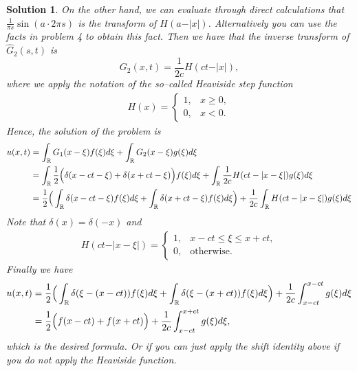 \documentclass[6pt]{article}
\newtheorem{solution}{Solution}
\numberwithin{equation}{section}
\def\mathbb{\Bbb}
\begin{document}
\begin{enumerate}
\begin{solution}
On the other hand, we can evaluate through direct calculations that $\frac{1}{\pi s}\sin{(a\cdot 2\pi s)}$ is the transform of $H(a-\vert x\vert)$.  Alternatively you can use the facts in problem 4 to obtain this fact.  Then we have that the inverse transform of $\hat{G}_2 (s,t)$ is
\[G_2(x,t)=\frac{1}{2c}H(ct-\vert x\vert),\]
where we apply the notation of the so--called Heaviside step function
\begin{align*}
H(x)=
\begin{cases}
1, &x\geq 0, \\
0, &x<0.
\end{cases}
\end{align*}
Hence, the solution of the problem is
\begin{align*}
u(x,t)&=\int_{\mathbb{R}}G_1(x-\xi)f(\xi)d\xi+\int_{\mathbb{R}}G_2(x-\xi)g(\xi)d\xi \\
& = \int_{\mathbb{R}}\frac{1}{2}\Big(\delta(x-ct-\xi)+\delta(x+ct-\xi)\Big)f(\xi)d\xi+\int_{\mathbb{R}}\frac{1}{2c}H(ct-\vert x-\xi\vert)g(\xi)d\xi\\
&=\frac{1}{2}\Big(\int_{\mathbb{R}}\delta(x-ct-\xi)f(\xi)d\xi+\int_{\mathbb{R}}\delta(x+ct-\xi)f(\xi)d\xi\Big)+\frac{1}{2c}\int_{\mathbb{R}}H(ct-\vert x-\xi\vert)g(\xi)d\xi
\end{align*}
Note that $\delta(x)=\delta(-x)$ and
\begin{align*}
H(ct-\vert x-\xi\vert)=
\begin{cases}
1, &x-ct\leqslant\xi\leqslant x+ct,\\
0, &\text{otherwise}.
\end{cases}
\end{align*}
Finally we have
\begin{align*}
u(x,t)&=\frac{1}{2}\Big(\int_{\mathbb{R}}\delta(\xi-(x-ct))f(\xi)d\xi+\int_{\mathbb{R}}\delta(\xi-(x+ct))f(\xi)d\xi\Big)+\frac{1}{2c}\int_{x-ct}^{x-ct}g(\xi)d\xi \\
&=\frac{1}{2}\Big(f(x-ct)+f(x+ct)\Big)+\frac{1}{2c}\int_{x-ct}
^{x+ct} g(\xi)d\xi,
\end{align*}
which is the desired formula.  Or if you can just apply the shift identity above if you do not apply the Heaviside function.
\end{solution}



\end{enumerate}
\end{document}
